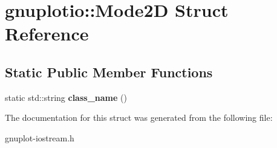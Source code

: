 \hypertarget{structgnuplotio_1_1Mode2D}{}\section{gnuplotio\+:\+:Mode2D Struct Reference}
\label{structgnuplotio_1_1Mode2D}
\subsection*{Static Public Member Functions}
\begin{DoxyCompactItemize}
\item 
\mbox{\label{structgnuplotio_1_1Mode2D_aaf35c9cd117de8bc5dbc2d5ec1224232}} 
static std\+::string {\bfseries class\+\_\+name} ()
\end{DoxyCompactItemize}


The documentation for this struct was generated from the following file\+:\begin{DoxyCompactItemize}
\item 
gnuplot-\/iostream.\+h\end{DoxyCompactItemize}
